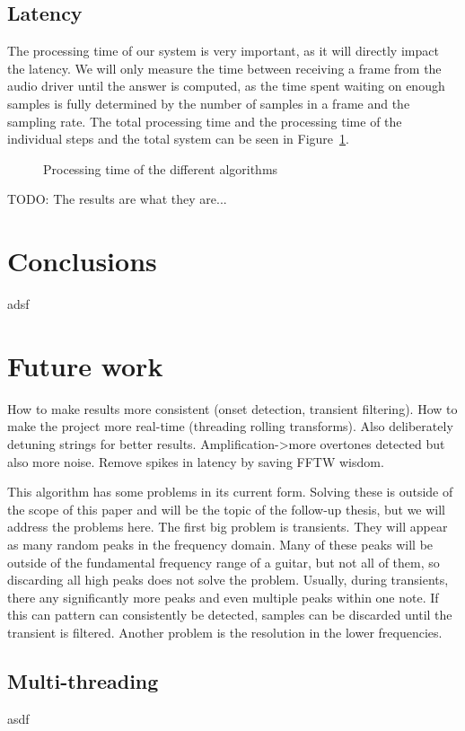 \documentclass[10pt,twocolumn]{article}
\begin{document}
\subsection{Latency}  \label{sub:algspeed}
The processing time of our system is very important, as it will directly impact the latency. We will only measure the time between receiving a frame from the audio driver until the answer is computed, as the time spent waiting on enough samples is fully determined by the number of samples in a frame and the sampling rate. The total processing time and the processing time of the individual steps and the total system can be seen in Figure~\ref{fig:snel}.
\begin{figure}[H]%
    \centering
    \begin{subfigure}{.49\textwidth}
        \centering
    \end{subfigure}
    \begin{subfigure}{.49\textwidth}
        \centering
    \end{subfigure}
    \caption{Processing time of the different algorithms}
    \label{fig:snel}
\end{figure}%
TODO: The results are what they are...


\section{Conclusions}
adsf


\section{Future work}  \label{sec:future}
How to make results more consistent (onset detection, transient filtering). How to make the project more real-time (threading rolling transforms). Also deliberately detuning strings for better results. Amplification->more overtones detected but also more noise. Remove spikes in latency by saving FFTW wisdom.

This algorithm has some problems in its current form. Solving these is outside of the scope of this paper and will be the topic of the follow-up thesis, but we will address the problems here. The first big problem is transients. They will appear as many random peaks in the frequency domain. Many of these peaks will be outside of the fundamental frequency range of a guitar, but not all of them, so discarding all high peaks does not solve the problem. Usually, during transients, there any significantly more peaks and even multiple peaks within one note. If this can pattern can consistently be detected, samples can be discarded until the transient is filtered. Another problem is the resolution in the lower frequencies.

\subsection{Multi-threading}  \label{sub:futlaten}
asdf





\end{document}
